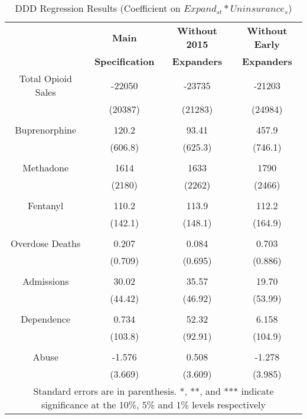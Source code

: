 \documentclass[11pt]{article}
\begin{document}
\begin{table}[!h]
\centering
\caption{DDD Regression Results (Coefficient on $Expand_{st}*Uninsurance_s$)}
\label{DDD1}
\begin{tabular}{cccc}
\hline
\textbf{} &
\textbf{Main} & \textbf{Without 2015} & {\textbf{Without Early}}  \\ 
& \textbf{Specification} & \textbf{Expanders} & {\textbf{Expanders}}  \\ \hline
Total Opioid Sales & -22050 & -23735 & -21203 \\
                           & (20387) & (21283) & (24984)\\  
& & & \\   
Buprenorphine & 120.2 & 93.41 & 457.9 \\
                      & (606.8) & (625.3) & (746.1) \\ 
& & & \\
Methadone & 1614 & 1633  & 1790\\
                 & (2180) & (2262) & (2466) \\ 
& & & \\
Fentanyl & 110.2 & 113.9  &  112.2\\
              & (142.1) & (148.1) & (164.9) \\ 

& & & \\
Overdose Deaths & 0.207 & 0.084 & 0.703  \\ 
                          & (0.709) & (0.695) & (0.886) \\ 
& & & \\
Admissions & 30.02 & 35.57 & 19.70  \\
                 & (44.42) & (46.92) & (53.99)\\ 
& & & \\
Dependence & 0.734 & 52.32 & 6.158\\
                   & (103.8) & (92.91) & (104.9)\\ 
& & & \\
Abuse &-1.576 & 0.508 & -1.278\\
           & (3.669) & (3.609) & (3.985)\\ 
\hline
 \multicolumn{4}{c}{\tiny{Standard errors are in parenthesis.  *, **, and *** indicate significance at the 10\%, 5\% and 1\% levels respectively}} \\
\hline
\end{tabular}
\end{table}


\cleardoublepage
\end{document}
